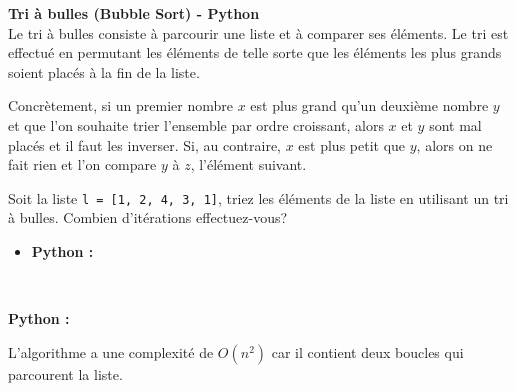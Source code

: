 \begin{Exercice} [20 minutes] \textbf{Tri à bulles (Bubble Sort) - Python \optionnel} \\
    Le tri à bulles consiste à parcourir une liste et à comparer ses éléments. Le tri est effectué en permutant les éléments de telle sorte que les éléments les plus grands soient placés à la fin de la liste. 
    
    Concrètement, si un premier nombre $x$ est plus grand qu'un deuxième  nombre $y$ et que l'on souhaite trier l'ensemble par ordre croissant, alors $x$ et $y$ sont mal placés et il faut les inverser. Si, au contraire, $x$ est plus petit que $y$, alors on ne fait rien et l'on compare $y$ à $z$, l'élément suivant.
    
    Soit la liste \lstinline{l = [1, 2, 4, 3, 1]}, triez les éléments de la liste en utilisant un tri à bulles. Combien d'itérations effectuez-vous?
    
    \begin{itemize}
            \item \textbf{Python :}
                 
        \end{itemize}
       
        \ \\
        
        \begin{solution}
        \textbf{Python :}
        
    \end{solution}
    \begin{solution}
        L'algorithme a une complexité de $O(n^2)$ car il contient deux boucles qui parcourent la liste.
    \end{solution}
    
    \end{Exercice}






